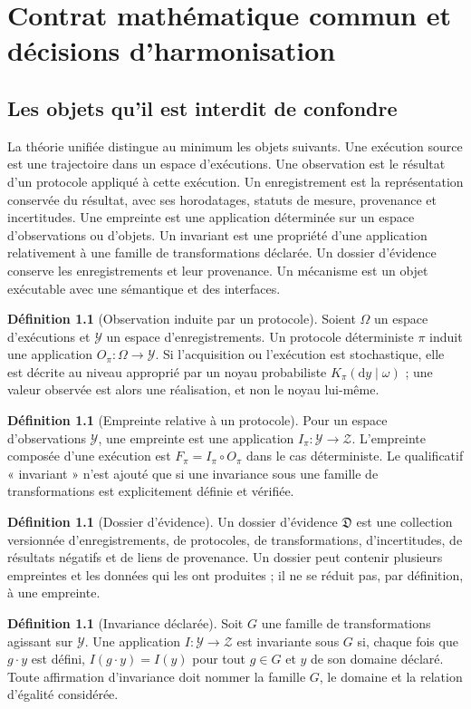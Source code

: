 \documentclass[11pt,oneside]{book}
\theoremstyle{definition}
\newtheorem{definition}[theoreme]{Définition}
\theoremstyle{remark}
\newcommand{\Zcal}{\mathcal Z}
\newcommand{\Ycal}{\mathcal Y}
\newcommand{\1}{\mathbf 1}
\newcommand{\dd}{\mathrm d}
\begin{document}
\chapter{Contrat mathématique commun et décisions d'harmonisation}
\section{Les objets qu'il est interdit de confondre}
La théorie unifiée distingue au minimum les objets suivants. Une exécution source est une trajectoire dans un espace d'exécutions. Une observation est le résultat d'un protocole appliqué à cette exécution. Un enregistrement est la représentation conservée du résultat, avec ses horodatages, statuts de mesure, provenance et incertitudes. Une empreinte est une application déterminée sur un espace d'observations ou d'objets. Un invariant est une propriété d'une application relativement à une famille de transformations déclarée. Un dossier d'évidence conserve les enregistrements et leur provenance. Un mécanisme est un objet exécutable avec une sémantique et des interfaces.

\begin{definition}[Observation induite par un protocole]
Soient $\Omega$ un espace d'exécutions et $\Ycal$ un espace d'enregistrements. Un protocole déterministe $\pi$ induit une application $O_\pi:\Omega\to\Ycal$. Si l'acquisition ou l'exécution est stochastique, elle est décrite au niveau approprié par un noyau probabiliste $K_\pi(\dd y\mid\omega)$ ; une valeur observée est alors une réalisation, et non le noyau lui-même.
\end{definition}
\begin{definition}[Empreinte relative à un protocole]
Pour un espace d'observations $\Ycal$, une empreinte est une application $I_\pi:\Ycal\to\Zcal$. L'empreinte composée d'une exécution est $F_\pi=I_\pi\circ O_\pi$ dans le cas déterministe. Le qualificatif « invariant » n'est ajouté que si une invariance sous une famille de transformations est explicitement définie et vérifiée.
\end{definition}
\begin{definition}[Dossier d'évidence]
Un dossier d'évidence $\mathfrak D$ est une collection versionnée d'enregistrements, de protocoles, de transformations, d'incertitudes, de résultats négatifs et de liens de provenance. Un dossier peut contenir plusieurs empreintes et les données qui les ont produites ; il ne se réduit pas, par définition, à une empreinte.
\end{definition}
\begin{definition}[Invariance déclarée]
Soit $G$ une famille de transformations agissant sur $\Ycal$. Une application $I:\Ycal\to\Zcal$ est invariante sous $G$ si, chaque fois que $g\cdot y$ est défini, $I(g\cdot y)=I(y)$ pour tout $g\in G$ et $y$ de son domaine déclaré. Toute affirmation d'invariance doit nommer la famille $G$, le domaine et la relation d'égalité considérée.
\end{definition}
\end{document}
